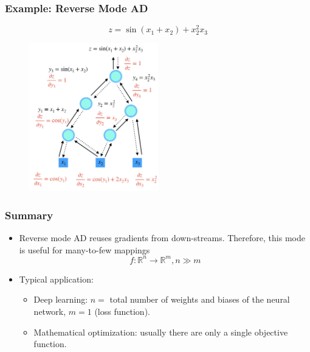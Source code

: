 \documentclass{beamer}
\begin{document}
\begin{frame}
\frametitle{Example: Reverse Mode AD}	
$$z=\sin(x_1+x_2) + x_2^2x_3$$
\begin{figure}[hbt]
\centering
  \includegraphics[width=0.5\textwidth]{figures/bd4}
\end{figure}
\end{frame}

\begin{frame}
	\frametitle{Summary}
	
	\begin{itemize}
		\item Reverse mode AD reuses gradients from down-streams. Therefore, this mode is useful for many-to-few mappings
		$$f:\mathbb{R}^n\rightarrow \mathbb{R}^m, n\gg m$$
		\item Typical application:
		\begin{itemize}
		\item Deep learning: $n=$ total number of weights and biases of the neural network, $m=1$ (loss function). 
		\item Mathematical optimization: usually there are only a single objective function. 
		\end{itemize}
	\end{itemize}
\end{frame}
\end{document}
